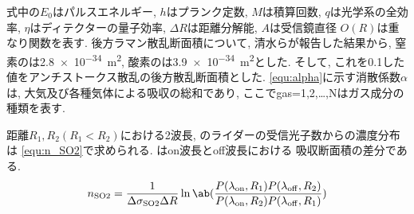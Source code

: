 \noindent
式中の$E_0$はパルスエネルギー, 
$h$はプランク定数, 
$M$は積算回数, 
$q$は光学系の全効率, 
$\eta$はディテクターの量子効率, 
$\Delta R$は距離分解能, 
$A$は受信鏡直径
$O(R)$は重なり関数を表す. 
後方ラマン散乱断面積について,
清水らが報告した結果から, 
窒素のは\qty{2.8e-34}{m^2}, 
酸素のは\qty{3.9e-34}{m^2}とした\cite{ramanXS}. 
そして, これを0.1した値をアンチストークス散乱の後方散乱断面積とした. 
\cref{equ:alpha}に示す消散係数$\alpha$は, 大気及び各種気体による吸収の総和であり, 
ここでgas=1,2,…,Nはガス成分の種類を表す. 

距離$R_1, R_2(R_1<R_2)$における2波長, 
のライダーの受信光子数からの濃度分布は
\cref{equ:n_SO2}で求められる\cite{DIALEqu}.
\Delta\sigma はon波長とoff波長における
吸収断面積の差分である. 
\begin{equation}
    \subrm{n}{SO2}
    =\frac{1}{\Delta\subrm{\sigma}{SO2}\Delta R}\ln\ab(
        \frac
        {P(\subrm{\lambda}{on}, R_1)P(\subrm{\lambda}{off}, R_2)}
        {P(\subrm{\lambda}{on}, R_2)P(\subrm{\lambda}{off}, R_1)}
    )\label{equ:n_SO2}
\end{equation}




